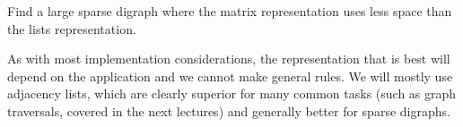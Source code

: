 \begin{Boxample}[2]
Find a large sparse digraph where the matrix representation uses less space than the lists representation.
\end{Boxample}

As with most implementation considerations, the representation that is best will depend on the application and we cannot make general rules.  We will mostly use adjacency lists, which are
clearly superior for many common tasks (such as graph traversals, covered
in the next lectures) and generally better for sparse digraphs.


%

